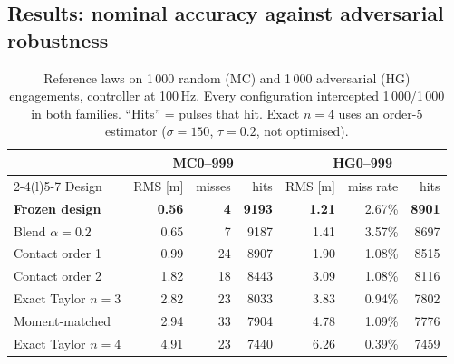 
\subsection{Results: nominal accuracy against adversarial robustness}
\begin{table}[H]
\centering\small
\caption{Reference laws on 1\,000 random (MC) and 1\,000 adversarial (HG) engagements, controller at 100\,Hz. Every configuration intercepted 1\,000/1\,000 in both families. ``Hits'' = pulses that hit. Exact $n=4$ uses an order-5 estimator ($\sigma=150$, $\tau=0.2$, not optimised).}
\label{tab:research}
\begin{tabular}{@{}lrrrrrr@{}}
\toprule
& \multicolumn{3}{c}{MC0--999} & \multicolumn{3}{c}{HG0--999}\\
\cmidrule(lr){2-4}\cmidrule(l){5-7}
Design & RMS [m] & misses & hits & RMS [m] & miss rate & hits\\
\midrule
\textbf{Frozen design} & \textbf{0.56} & \textbf{4} & \textbf{9193} & \textbf{1.21} & 2.67\% & \textbf{8901}\\
Blend $\alpha=0.2$ & 0.65 & 7 & 9187 & 1.41 & 3.57\% & 8697\\
Contact order 1 & 0.99 & 24 & 8907 & 1.90 & 1.08\% & 8515\\
Contact order 2 & 1.82 & 18 & 8443 & 3.09 & 1.08\% & 8116\\
Exact Taylor $n=3$ & 2.82 & 23 & 8033 & 3.83 & 0.94\% & 7802\\
Moment-matched & 2.94 & 33 & 7904 & 4.78 & 1.09\% & 7776\\
Exact Taylor $n=4$ & 4.91 & 23 & 7440 & 6.26 & 0.39\% & 7459\\
\bottomrule
\end{tabular}
\end{table}


